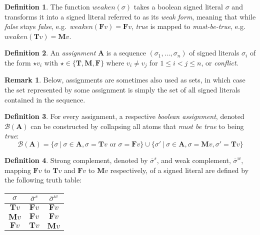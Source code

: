 \documentclass{vutinfth} %
\theoremstyle{example}
\theoremstyle{definition}
\newtheorem{definition}{Definition}[section]
\theoremstyle{theorem}
\theoremstyle{lemma}
\theoremstyle{corollary}
\newtheorem*{remark}{Remark}
\newcommand{\mbt}{must-be-true}
\newcommand{\negstrong}[1]{\overline{#1}^s}
\newcommand{\negweak}[1]{\overline{#1}^w}
\newcommand{\bass}{\mathcal{B}}
\newcommand{\ass}{\mathbf{A}}
\newcommand{\bT}{\mathbf{T}}
\newcommand{\bM}{\mathbf{M}}
\newcommand{\bF}{\mathbf{F}}
\newcommand{\thrice}{{\{\bT, \bM, \bF \}}}
\newcommand{\wkn}{\textit{weaken}}
\begin{document}
\begin{definition}
The function $\wkn(\sigma)$ takes a boolean signed literal $\sigma$ and transforms it into a signed literal referred to as its \emph{weak form}, meaning that while \emph{false} stays \emph{false}, e.g.~$\wkn(\bF v) = \bF v$, \emph{true} is mapped to \emph{\mbt}, e.g.~$\wkn(\bT v) = \bM v$.
\end{definition}


\begin{definition}
An \emph{assignment} $\ass$ is a sequence $(\sigma_1, \ldots, \sigma_n)$ of signed literals $\sigma_i$ of the form $\star v_i$ with $\star \in \thrice$ where $v_i \not = v_j$ for $1 \leq i < j \leq n$, or \emph{conflict}.
\end{definition}

\begin{remark}
Below, assignments are sometimes also used as sets, in which case the set represented by some assignment is simply the set of all signed literals contained in the sequence.
\end{remark}

\begin{definition}
For every assignment, a respective \emph{boolean assignment}, denoted $\bass(\ass)$ can be constructed by collapsing all atoms that \emph{must be true} to being \emph{true}:$$\bass(\ass) = \{ \sigma \ | \ \sigma \in \ass, \sigma = \mathbf{T}v \textrm{ or } \sigma = \mathbf{F}v \} \cup \{ \sigma' \ | \ \sigma \in \ass, \sigma = \mathbf{M}v, \sigma' = \mathbf{T}v \}$$
\end{definition}

\begin{definition}
Strong complement, denoted by $\negstrong{\sigma}$, and weak complement, $\negweak{\sigma}$, mapping $\mathbf{F}v$ to $\mathbf{T}v$ and $\mathbf{F}v$ to $\mathbf{M}v$ respectively, of a signed literal are defined by the following truth table:%

\begin{center}
\begin{tabular}{|c|cc|}
\hline
$\sigma$&$\negstrong{\sigma}$&$\negweak{\sigma}$\\
\hline
\hline
$\mathbf{T}v$&$\mathbf{F}v$&$\mathbf{F}v$\\
$\mathbf{M}v$&$\mathbf{F}v$&$\mathbf{F}v$\\
$\mathbf{F}v$&$\mathbf{T}v$&$\mathbf{M}v$\\
\hline
\end{tabular}
\end{center}
\end{definition}
\end{document}
